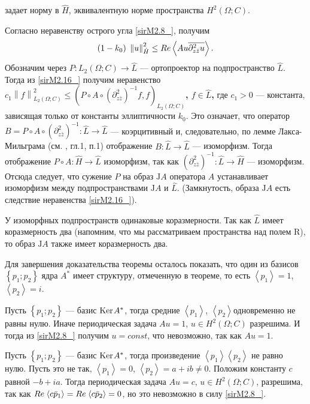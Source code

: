 задает норму в $\hat{H}$, эквивалентную норме пространства $H^{2} (\Omega ;C)$.

Согласно неравенству острого угла \eqref{sirM2.8_}, получим
\begin{equation}
(1-k_{0} ){\kern 1pt} {\kern 1pt} {\kern 1pt} \left\| u\right\| _{\hat{H}}^{2} \le Re\left\langle Au\overline{\partial _{z\bar{z}}^{2} u}\right\rangle.
\label{sirM2.16_}
\end{equation}
Обозначим через  $P:L_{2} (\Omega ;C)\to \hat{L}$ --- ортопроектор на подпространство  $\hat{L}$. Тогда из \eqref{sirM2.16_} получим неравенство      \textbf{$c_{1} \left\| f\right\| _{L_{2} (\Omega ;C)}^{2} \le \left(P\circ A\circ \left(\partial _{z\bar{z}}^{2} \right)^{-1} f,f\right)_{L_{2} (\Omega ;C)} $,  $f\in \hat{L}$,}  где $c_{1} >0$ --- константа, зависящая только от константы эллиптичности $k_{0} $. Это означает, что оператор $B=P\circ A\circ \left(\partial _{z\bar{z}}^{2} \right)^{-1} :\hat{L}\to \hat{L}$ --- коэрцитивный и, следовательно, по лемме Лакса-Мильграма (см. \cite{JikovKozlov}, гл.1, п.1) отображение  $B:\hat{L}\to \hat{L}$ --- изоморфизм. Тогда отображение $P\circ A:\hat{H}\to \hat{L}$ изоморфизм, так как $\left(\partial _{z\bar{z}}^{2} \right)^{-1} :\hat{L}\to \hat{H}$ --- изоморфизм. Отсюда следует, что сужение $P$ на образ $\mathrm{ J}A$ оператора $A$ устанавливает изоморфизм между подпространствами $\mathrm{ J}A$ и $\hat{L}$. (Замкнутость, образа $\mathrm{ J}A$ есть следствие неравенства \eqref{sirM2.16_}).

У изоморфных подпространств одинаковые коразмерности. Так как $\hat{L}$ имеет коразмерность два (напомним, что мы рассматриваем пространства над полем $\mathrm{ R}$), то образ $\mathrm{ J}A$ также имеет коразмерность два.

Для завершения доказательства теоремы осталось показать, что один из базисов $\left\{p_{1} ;p_{2} \right\}$ ядра $A^{*} $ имеет структуру, отмеченную в теореме, то есть $\left\langle p_{1} \right\rangle =1$, $\left\langle p_{2} \right\rangle =i$.

 Пусть $\left\{p_{1} ;p_{2} \right\}$ --- базис $\mathrm{ Ker}{\kern 1pt} A^{*} $, тогда средние $\left\langle p_{1} \right\rangle $, $\left\langle p_{2} \right\rangle $одновременно не  равны нулю. Иначе периодическая задача $Au=1$, $u\in H^{2} (\Omega ;C)$ разрешима. И тогда из \eqref{sirM2.8_} получим $u=const$, что невозможно, так как $Au=1$.

Пусть $\left\{p_{1} ;p_{2} \right\}$ --- базис $\mathrm{ Ker}{\kern 1pt} A^{*} $, тогда произведение $\left\langle p_{1} \right\rangle \left\langle p_{2} \right\rangle $ не равно нулю. Пусть это не так, $\left\langle p_{1} \right\rangle =0$, $\left\langle p_{2} \right\rangle =a+ib\ne 0$. Положим константу $c$ равной $-b+ia$. Тогда периодическая задача $Au=c$, $u\in H^{2} (\Omega ;C)$, разрешима, так как $Re{\kern 1pt} \left\langle c\bar{p}_{1} \right\rangle =Re{\kern 1pt} \left\langle c\bar{p}_{2} \right\rangle =0$, но это невозможно в силу \eqref{sirM2.8_}.

